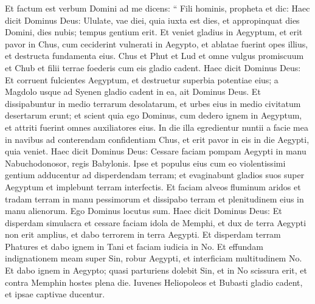 \begin{biblechapter}
\begin{biblechapter}
\begin{biblechapter}
\begin{biblechapter}
\begin{biblechapter}
\begin{biblechapter}
\begin{biblechapter}
\begin{biblechapter}
\begin{biblechapter}
\begin{biblechapter}
\begin{biblechapter}
\begin{biblechapter}
\begin{biblechapter}
\begin{biblechapter}
\begin{biblechapter}
\begin{biblechapter}
\begin{biblechapter}
\begin{biblechapter}
\begin{biblechapter}
\begin{biblechapter}
\begin{biblechapter}
\begin{biblechapter}
\begin{biblechapter}
\begin{biblechapter}
\begin{biblechapter}
\begin{biblechapter}
\begin{biblechapter}
\begin{biblechapter}
\begin{biblechapter}
\begin{biblechapter}
\verse Et factum est verbum Domini ad me dicens: 
\verse “ Fili hominis, propheta et dic: Haec dicit Dominus Deus:
 Ululate, vae diei,
 \verse quia iuxta est dies,
 et appropinquat dies Domini,
 dies nubis; tempus gentium erit.
 \verse Et veniet gladius in Aegyptum,
 et erit pavor in Chus,
 cum ceciderint vulnerati in Aegypto,
 et ablatae fuerint opes illius,
 et destructa fundamenta eius.
 \verse Chus et Phut et Lud et omne vulgus promiscuum
 et Chub et filii terrae foederis
 cum eis gladio cadent.
 \verse Haec dicit Dominus Deus:
 Et corruent fulcientes Aegyptum,
 et destruetur superbia potentiae eius;
 a Magdolo usque ad Syenen gladio cadent in ea,
 ait Dominus Deus.
 \verse Et dissipabuntur in medio terrarum desolatarum, et urbes eius in medio civitatum desertarum erunt; 
\verse et scient quia ego Dominus, cum dedero ignem in Aegyptum, et attriti fuerint omnes auxiliatores eius.
 \verse In die illa egredientur nuntii a facie mea in navibus ad conterendam confidentiam Chus, et erit pavor in eis in die Aegypti, quia veniet.
 \verse Haec dicit Dominus Deus: Cessare faciam pompam Aegypti in manu Nabuchodonosor, regis Babylonis. 
\verse Ipse et populus eius cum eo violentissimi gentium adducentur ad disperdendam terram; et evaginabunt gladios suos super Aegyptum et implebunt terram interfectis. 
\verse Et faciam alveos fluminum aridos et tradam terram in manu pessimorum et dissipabo terram et plenitudinem eius in manu alienorum. Ego Dominus locutus sum.
 \verse Haec dicit Dominus Deus:
 Et disperdam simulacra
 et cessare faciam idola de Memphi,
 et dux de terra Aegypti
 non erit amplius,
 et dabo terrorem in terra Aegypti.
 \verse Et disperdam terram Phatures
 et dabo ignem in Tani
 et faciam iudicia in No.
 \verse Et effundam indignationem meam super Sin, robur Aegypti, et interficiam multitudinem No. 
\verse Et dabo ignem in Aegypto; quasi parturiens dolebit Sin, et in No scissura erit, et contra Memphin hostes plena die. 
\verse Iuvenes Heliopoleos et Bubasti gladio cadent, et ipsae captivae ducentur. 

\end{biblechapter}
\end{biblechapter}
\end{biblechapter}
\end{biblechapter}
\end{biblechapter}
\end{biblechapter}
\end{biblechapter}
\end{biblechapter}
\end{biblechapter}
\end{biblechapter}
\end{biblechapter}
\end{biblechapter}
\end{biblechapter}
\end{biblechapter}
\end{biblechapter}
\end{biblechapter}
\end{biblechapter}
\end{biblechapter}
\end{biblechapter}
\end{biblechapter}
\end{biblechapter}
\end{biblechapter}
\end{biblechapter}
\end{biblechapter}
\end{biblechapter}
\end{biblechapter}
\end{biblechapter}
\end{biblechapter}
\end{biblechapter}
\end{biblechapter}
